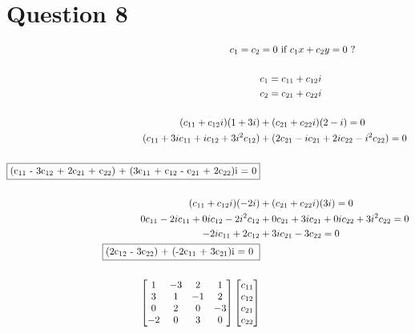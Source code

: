 \documentclass{article}
\begin{document}
\section{Question 8} 
\begin{align*}
c\textsubscript1 = c\textsubscript2 &= 0 \text{ if } c\textsubscript1x + c\textsubscript2y = 0 \text{ ?} \\ \\ 
&c\textsubscript1 = c\textsubscript{11} + c\textsubscript{12}i \\ 
&c\textsubscript2 = c\textsubscript{21} + c\textsubscript{22}i \\ \\  
(c\textsubscript{11} + c\textsubscript{12}i)(1+3i) &+ (c\textsubscript{21} + c\textsubscript{22}i)(2-i) = 0 
\\ (c\textsubscript{11} + 3ic\textsubscript{11} + ic\textsubscript{12} + 3i^2c\textsubscript{12}) &+ (2c\textsubscript{21} - ic\textsubscript{21} + 2ic\textsubscript{22} - i^2c\textsubscript{22}) = 0 \\ \\  
\fbox{(c\textsubscript{11} - 3c\textsubscript{12} + 2c\textsubscript{21} + c\textsubscript{22}) + (3c\textsubscript{11} + c\textsubscript{12} - c\textsubscript{21} + 2c\textsubscript{22})i = 0}&
\\ \\ 
(c\textsubscript{11} + c\textsubscript{12}i)(-2i) &+ (c\textsubscript{21} + c\textsubscript{22}i)(3i) = 0 
\\  
0c\textsubscript{11} - 2ic\textsubscript{11} + 0ic\textsubscript{12} - 2i^2c\textsubscript{12} &+ 
0c\textsubscript{21} + 3ic\textsubscript{21} + 0ic\textsubscript{22} + 3i^2c\textsubscript{22} = 0 
\\ 
-2ic\textsubscript{11} + 2c\textsubscript{12} &+ 3ic\textsubscript{21} - 3c\textsubscript{22} = 0 
\\ 
\fbox{(2c\textsubscript{12} - 3c\textsubscript{22}) + (-2c\textsubscript{11} + 3c\textsubscript{21})i = 0 }&
\\ \\ 
\begin{bmatrix} 
1 & -3 & 2 & 1 \\ 
3 & 1 & -1 & 2 \\ 
0 & 2 & 0 & -3 \\ 
-2 & 0 & 3 & 0 
\end{bmatrix}
\begin{bmatrix}
c\textsubscript{11} \\ c\textsubscript{12} \\ c\textsubscript{21} \\ c\textsubscript{22} 

\end{bmatrix}
\end{align*}
\end{document}
